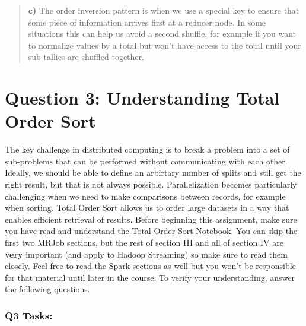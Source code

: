 \documentclass[11pt]{article}
\begin{document}
\begin{quote}
\textbf{c)} The order inversion pattern is when we use a special key to
ensure that some piece of information arrives first at a reducer node.
In some situations this can help us avoid a second shuffle, for example
if you want to normalize values by a total but won't have access to the
total until your sub-tallies are shuffled together.
\end{quote}

    \section{Question 3: Understanding Total Order
Sort}\label{question-3-understanding-total-order-sort}

The key challenge in distributed computing is to break a problem into a
set of sub-problems that can be performed without communicating with
each other. Ideally, we should be able to define an arbirtary number of
splits and still get the right result, but that is not always possible.
Parallelization becomes particularly challenging when we need to make
comparisons between records, for example when sorting. Total Order Sort
allows us to order large datasets in a way that enables efficient
retrieval of results. Before beginning this assignment, make sure you
have read and understand the
\href{https://github.com/UCB-w261/main/tree/master/HelpfulResources/TotalSortGuide/_total-sort-guide-spark2.01-JAN27-2017.ipynb}{Total
Order Sort Notebook}. You can skip the first two MRJob sections, but the
rest of section III and all of section IV are \textbf{very} important
(and apply to Hadoop Streaming) so make sure to read them closely. Feel
free to read the Spark sections as well but you won't be responsible for
that material until later in the course. To verify your understanding,
answer the following questions.

\subsubsection{Q3 Tasks:}\label{q3-tasks}
\end{document}
